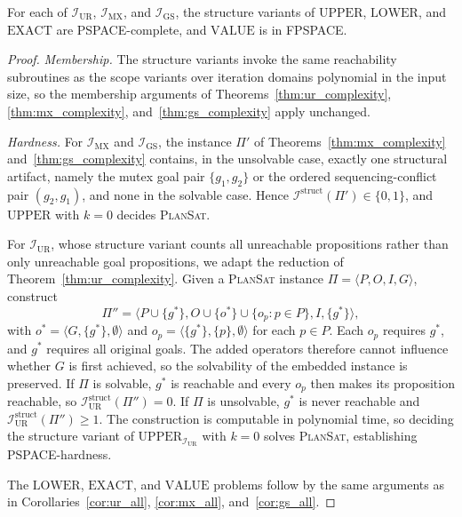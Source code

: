 \begin{prop}
    \label{prop:struct_complexity}
    For each of $\mathcal{I}_{\text{UR}}$, $\mathcal{I}_{\text{MX}}$, and $\mathcal{I}_{\text{GS}}$, the structure variants of $\text{UPPER}$, $\text{LOWER}$, and $\text{EXACT}$ are PSPACE-complete, and $\text{VALUE}$ is in FPSPACE.
\end{prop}
\begin{proof}
    \emph{Membership.} The structure variants invoke the same reachability subroutines as the scope variants over iteration domains polynomial in the input size, so the membership arguments of Theorems~\ref{thm:ur_complexity}, \ref{thm:mx_complexity}, and~\ref{thm:gs_complexity} apply unchanged.

    \emph{Hardness.} For $\mathcal{I}_{\text{MX}}$ and $\mathcal{I}_{\text{GS}}$, the instance $\Pi'$ of Theorems~\ref{thm:mx_complexity} and~\ref{thm:gs_complexity} contains, in the unsolvable case, exactly one structural artifact, namely the mutex goal pair $\{g_1, g_2\}$ or the ordered sequencing-conflict pair $(g_2, g_1)$, and none in the solvable case. Hence $\mathcal{I}^{\text{struct}}(\Pi') \in \{0, 1\}$, and $\text{UPPER}$ with $k = 0$ decides \textsc{PlanSat}.

    For $\mathcal{I}_{\text{UR}}$, whose structure variant counts all unreachable propositions rather than only unreachable goal propositions, we adapt the reduction of Theorem~\ref{thm:ur_complexity}. Given a \textsc{PlanSat} instance $\Pi = \langle P, O, I, G \rangle$, construct
    \begin{equation*}
        \Pi'' = \langle P \cup \{g^*\}, O \cup \{o^*\} \cup \{o_p : p \in P\}, I, \{g^*\} \rangle,
    \end{equation*}
    with $o^* = \langle G, \{g^*\}, \emptyset \rangle$ and $o_p = \langle \{g^*\}, \{p\}, \emptyset \rangle$ for each $p \in P$. Each $o_p$ requires $g^*$, and $g^*$ requires all original goals. The added operators therefore cannot influence whether $G$ is first achieved, so the solvability of the embedded instance is preserved. If $\Pi$ is solvable, $g^*$ is reachable and every $o_p$ then makes its proposition reachable, so $\mathcal{I}^{\text{struct}}_{\text{UR}}(\Pi'') = 0$. If $\Pi$ is unsolvable, $g^*$ is never reachable and $\mathcal{I}^{\text{struct}}_{\text{UR}}(\Pi'') \geq 1$. The construction is computable in polynomial time, so deciding the structure variant of $\text{UPPER}_{\mathcal{I}_{\text{UR}}}$ with $k = 0$ solves \textsc{PlanSat}, establishing PSPACE-hardness.

    The $\text{LOWER}$, $\text{EXACT}$, and $\text{VALUE}$ problems follow by the same arguments as in Corollaries~\ref{cor:ur_all}, \ref{cor:mx_all}, and~\ref{cor:gs_all}.
\end{proof}


